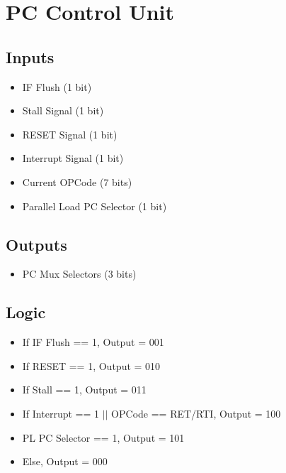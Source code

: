 \section{PC Control Unit}

\subsection{Inputs}
\begin{itemize}
    \item IF Flush (1 bit)
    \item Stall Signal (1 bit)
    \item RESET Signal (1 bit)
    \item Interrupt Signal (1 bit)
    \item Current OPCode (7 bits)
    \item Parallel Load PC Selector (1 bit)
\end{itemize}

\subsection{Outputs}
\begin{itemize}
    \item PC Mux Selectors (3 bits)
\end{itemize}

\subsection{Logic}
\begin{itemize}
    \item If IF Flush == 1, Output = 001
    \item If RESET == 1, Output = 010
    \item If Stall == 1, Output = 011
    \item If Interrupt == 1 $||$ OPCode == RET/RTI, Output = 100
    \item PL PC Selector == 1, Output = 101
    \item Else, Output = 000
\end{itemize}

